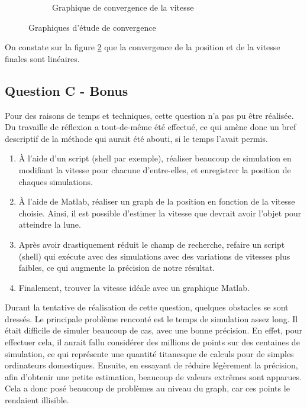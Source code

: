 \documentclass[a4paper,12pt,twoside]{article}
\begin{document}
\begin{figure}[h]
\begin{subfigure}[b]{0.45\textwidth}
		\caption{Graphique de convergence de la vitesse}
		\label{fig:B-vConv}
	\end{subfigure}
	\caption{Graphiques d'étude de convergence}
	\label{fig:B-conv}
\end{figure}

On constate sur la figure \ref{fig:B-conv} que la convergence de la position et de la vitesse finales sont linéaires.

\subsection{Question C - Bonus}
Pour des raisons de temps et techniques, cette question n'a pas pu être réalisée.
Du travaille de réflexion a tout-de-même été effectué, ce qui amène donc un bref descriptif de la méthode qui aurait été abouti, si le temps l'avait permis.
\begin{enumerate}
	\item À l'aide d'un script (shell par exemple), réaliser beaucoup de simulation en modifiant la vitesse pour chacune d'entre-elles, et enregistrer la position de chaques simulations.
	\item À l'aide de Matlab, réaliser un graph de la position en fonction de la vitesse choisie. Ainsi, il est possible d'estimer la vitesse que devrait avoir l'objet pour atteindre la lune.
	\item Après avoir drastiquement réduit le champ de recherche, refaire un script (shell) qui exécute avec des simulations avec des variations de vitesses plus faibles, ce qui augmente la précision de notre résultat.
	\item Finalement, trouver la vitesse idéale avec un graphique Matlab.
\end{enumerate}

Durant la tentative de réalisation de cette question, quelques obstacles se sont dressés.
Le principale problème renconté est le temps de simulation assez long.
Il était difficile de simuler beaucoup de cas, avec une bonne précision. 
En effet, pour effectuer cela, il aurait fallu considérer des millions de points sur des centaines de simulation, ce qui représente une quantité titanesque de calculs pour de simples ordinateurs domestiques.
Ensuite, en essayant de réduire légèrement la précision, afin d'obtenir une petite estimation, beaucoup de valeurs extrêmes sont apparues.
Cela a donc posé beaucoup de problèmes au niveau du graph, car ces points le rendaient illisible.\\
\end{document}

